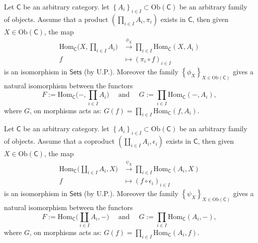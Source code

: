 \begin{prop}
	Let $\mathsf{C}$ be an arbitrary category.
	let $\left\{ A_i \right\}_{i \in I} \subset \mathrm{Ob} \left(\mathsf{C}\right)$ be an arbitrary family of objects.
	Assume that a product $\left(\prod_{i \in I}A_i, \pi_i\right)$ exists in $\mathsf{C}$, then
	given $X \in \mathrm{Ob} \left(\mathsf{C}\right)$, the map
	\begin{align}
		\mathrm{Hom}_{\mathsf{C}} \bigg( X, \prod_{i \in I}A_i \bigg)  &\xrightarrow{\phi_X} \prod_{i \in I} \mathrm{Hom}_{\mathsf{C}} \left( X, A_i \right) \\
		f &\mapsto \left( \pi_i \circ f \right)_{i \in I}
	\end{align} 
	is an isomorphism in $\mathsf{Sets}$ (by U.P.).
	Moreover the family $\left\{ \phi_X \right\}_{X \in \mathrm{Ob} \left(\mathsf{C}\right)}$ gives a natural isomorphism between the functors
	\begin{equation}
	F := \mathrm{Hom}_{\mathsf{C}} \bigg( -, \prod_{i \in I} A_i \bigg) \quad \text{ and } \quad G:= \prod_{i \in I} \mathrm{Hom}_{\mathsf{C}} \left( -, A_i \right)
	,\end{equation} 
	where $G$, on morphisms acts as: $G(f) = \prod_{i \in I} \mathrm{Hom}_{\mathsf{C}} \left( f, A_i \right)$.
\end{prop} 

\begin{prop}
	Let $\mathsf{C}$ be an arbitrary category.
	let $\left\{ A_i \right\}_{i \in I} \subset \mathrm{Ob} \left(\mathsf{C}\right)$ be an arbitrary family of objects.
	Assume that a coproduct $\left(\coprod_{i \in I}A_i, \epsilon_i\right)$ exists in $\mathsf{C}$, then
	given $X \in \mathrm{Ob} \left(\mathsf{C}\right)$, the map
	\begin{align}
		\mathrm{Hom}_{\mathsf{C}} \bigg( \coprod_{i \in I}A_i, X \bigg)  &\xrightarrow{\psi_X} \prod_{i \in I} \mathrm{Hom}_{\mathsf{C}} \left( A_i, X \right) \\
		f &\mapsto \left( f \circ \epsilon_i \right)_{i \in I}
	\end{align} 
	is an isomorphism in $\mathsf{Sets}$ (by U.P.).
	Moreover the family $\left\{ \psi_X \right\}_{X \in \mathrm{Ob} \left(\mathsf{C}\right)}$ gives a natural isomorphism between the functors
	\begin{equation}
	F := \mathrm{Hom}_{\mathsf{C}} \bigg( \coprod_{i \in I} A_i, - \bigg) \quad \text{ and } \quad G:= \prod_{i \in I} \mathrm{Hom}_{\mathsf{C}} \left( A_i, - \right)
	,\end{equation} 
	where $G$, on morphisms acts as: $G(f) = \prod_{i \in I} \mathrm{Hom}_{\mathsf{C}} \left( A_i, f \right)$.
\end{prop} 


